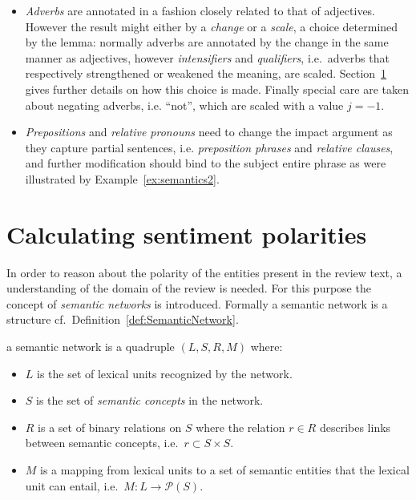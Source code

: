 \begin{itemize}
	\item \emph{Adverbs} are annotated in a fashion closely related to that of adjectives. However the result might either by a \emph{change} or a \emph{scale}, a choice determined by the lemma: normally adverbs are annotated by the change in the same manner as adjectives, however \emph{intensifiers} and \emph{qualifiers}, i.e.\ adverbs that respectively strengthened or weakened the meaning, are scaled. Section~\ref{sec:sentimentValue} gives further details on how this choice is made. Finally special care are taken about negating adverbs, i.e. ``not'', which are scaled with a value $j = -1$.

	\item \emph{Prepositions} and \emph{relative pronouns} need to change the impact argument as they capture partial sentences, i.e. \emph{preposition phrases} and \emph{relative clauses}, and further modification should bind to the subject entire phrase as were illustrated by Example~\ref{ex:semantics2}.

	
\end{itemize}
\clearpage

\section{Calculating sentiment polarities}
\label{sec:sentimentValue}

In order to reason about the polarity of the entities present in the review text, a understanding of the domain of the review is needed.  For this purpose the concept of \emph{semantic networks} is introduced. Formally a semantic network is a structure cf.\ Definition~\ref{def:SemanticNetwork}.
\begin{definition}
a semantic network is a quadruple $(L,S,R,M)$ where:\\[-2em]
  \begin{itemize} %
    \item $L$ is the set of lexical units recognized by the network.
    \item $S$ is the set of \emph{semantic concepts} in the network.
    \item $R$ is a set of binary relations on $S$ where the relation $r \in R$ describes links\\ between semantic concepts, i.e.\ $r \subset S \times S$. 
    \item $M$ is a mapping from lexical units to a set of semantic entities that the lexical\\ unit can entail, i.e.\ $M: L \to \mathcal{P}(S)$.
  \end{itemize}
  \label{def:SemanticNetwork}
  \done
\end{definition}

